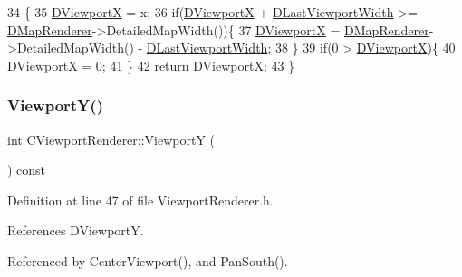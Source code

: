 \begin{DoxyCode}
34                                      \{
35     \hyperlink{classCViewportRenderer_aea9e05347f71a8e6b83439aab653be18}{DViewportX} = x;
36     \textcolor{keywordflow}{if}(\hyperlink{classCViewportRenderer_aea9e05347f71a8e6b83439aab653be18}{DViewportX} + \hyperlink{classCViewportRenderer_aaa21acd1b43badc3c1a3b0bf9b0f86f9}{DLastViewportWidth} >= 
      \hyperlink{classCViewportRenderer_ac6bc7771bd6dcd35107d25bebb0c0a4c}{DMapRenderer}->DetailedMapWidth())\{
37         \hyperlink{classCViewportRenderer_aea9e05347f71a8e6b83439aab653be18}{DViewportX} = \hyperlink{classCViewportRenderer_ac6bc7771bd6dcd35107d25bebb0c0a4c}{DMapRenderer}->DetailedMapWidth() - 
      \hyperlink{classCViewportRenderer_aaa21acd1b43badc3c1a3b0bf9b0f86f9}{DLastViewportWidth};
38     \}
39     \textcolor{keywordflow}{if}(0 > \hyperlink{classCViewportRenderer_aea9e05347f71a8e6b83439aab653be18}{DViewportX})\{
40         \hyperlink{classCViewportRenderer_aea9e05347f71a8e6b83439aab653be18}{DViewportX} = 0;
41     \}
42     \textcolor{keywordflow}{return} \hyperlink{classCViewportRenderer_aea9e05347f71a8e6b83439aab653be18}{DViewportX};
43 \}
\end{DoxyCode}
\hypertarget{classCViewportRenderer_add3d4da286927abe2f19fbb37fd42ed5}{}\label{classCViewportRenderer_add3d4da286927abe2f19fbb37fd42ed5} 
\subsubsection{\texorpdfstring{Viewport\+Y()}{ViewportY()}\hspace{0.1cm}{\footnotesize\ttfamily [1/2]}}
{\footnotesize\ttfamily int C\+Viewport\+Renderer\+::\+ViewportY (\begin{DoxyParamCaption}{ }\end{DoxyParamCaption}) const\hspace{0.3cm}{\ttfamily [inline]}}



Definition at line 47 of file Viewport\+Renderer.\+h.



References D\+ViewportY.



Referenced by Center\+Viewport(), and Pan\+South().


